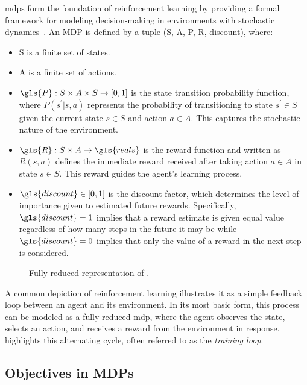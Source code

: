 \Glspl{mdp} form the foundation of reinforcement learning by providing 
a formal framework for modeling decision-making in environments with 
stochastic dynamics~\cite{puterman2005}. An MDP is defined by a tuple 
(\gls{S}, \gls{A}, \gls{P}, \gls{R}, \gls{discount}), where:
\begin{itemize}
    \item \gls{S} is a finite set of states.
    \item \gls{A} is a finite set of actions.
    \item \(\gls{P}: S\times A\times S\rightarrow [0,1]\) is the state 
        transition probability function, where \(P(s^\prime|s, a)\) 
        represents the probability of transitioning to state \(s^\prime\in S\)
        given the current state \(s\in S\) and action \(a\in A\).
        This captures the stochastic nature of the environment.
    \item \(\gls{R}: S \times A \rightarrow \gls{reals}\) is the reward 
        function and written as \(R(s, a)\) defines the immediate reward 
        received after taking action \(a\in A\) in state \(s\in S\). 
        This reward guides the agent's learning process.
    \item \(\gls{discount} \in [0, 1]\) is the discount factor, which 
        determines the level of importance given to estimated future rewards. 
        Specifically, \(\gls{discount}=1\) implies that a reward estimate is 
        given equal value regardless of how many steps in the future it may 
        be while \(\gls{discount}=0\) implies that only the value of a 
        reward in the next step is considered.
\end{itemize}

\begin{figure}
    \centering
    
    \caption{Fully reduced  
        representation of .}
    \label{fig:mdp_cycle}
\end{figure}

A common depiction of reinforcement learning illustrates it as a simple 
feedback loop between an agent and its environment. In its most basic form, 
this process can be modeled as a fully reduced \gls{mdp}, where the agent observes
the state, selects an action, and receives a reward from the environment in response. 
 highlights this alternating cycle, often referred to as the 
\emph{training loop}.

    \subsection*{Objectives in MDPs}%

